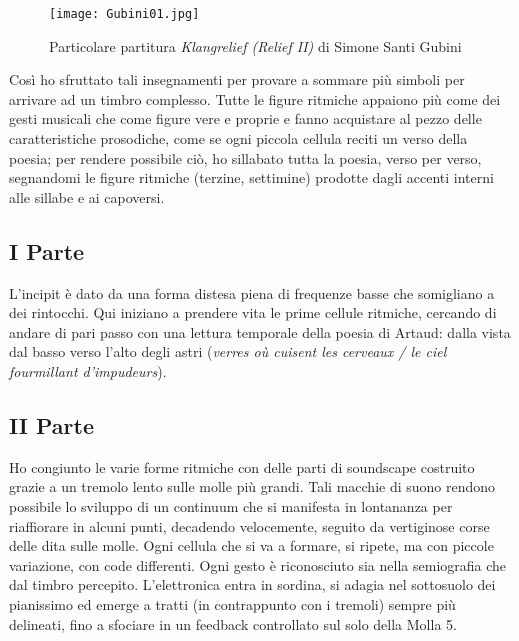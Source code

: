 \begin{figure}[htbp]
\begin{center}
\texttt{[image: Gubini01.jpg]}
\caption{Particolare partitura \textit{Klangrelief (Relief II)} di Simone Santi Gubini}
\label{default}
\end{center}
\end{figure}


Così ho sfruttato tali insegnamenti per provare a sommare più simboli per arrivare ad un timbro complesso.
Tutte le figure ritmiche appaiono più come dei gesti musicali che come figure vere e proprie e fanno acquistare al pezzo delle caratteristiche prosodiche, come se ogni piccola cellula reciti un verso della poesia; per rendere possibile ciò, ho sillabato tutta la poesia, verso per verso, segnandomi le figure ritmiche (terzine, settimine) prodotte dagli accenti interni alle sillabe e ai capoversi.


\subsection*{I Parte}

L'incipit è dato da una forma distesa piena di frequenze basse che somigliano a dei rintocchi. Qui iniziano a prendere vita le prime cellule ritmiche, cercando di andare di pari passo con una lettura temporale della poesia di Artaud: dalla vista dal basso verso l'alto degli astri (\textit{verres où cuisent les cerveaux / le ciel fourmillant d'impudeurs}).


\subsection*{II Parte}

Ho congiunto le varie forme ritmiche con delle parti di soundscape costruito grazie a un tremolo lento sulle molle più grandi. Tali macchie di suono rendono possibile lo sviluppo di un continuum che si manifesta in lontananza per riaffiorare in alcuni punti, decadendo velocemente, seguito da vertiginose corse delle dita sulle molle. Ogni cellula che si va a formare, si ripete, ma con piccole variazione, con code differenti. Ogni gesto è riconosciuto sia nella semiografia che dal timbro percepito. L'elettronica entra in sordina, si adagia nel sottosuolo dei pianissimo ed emerge a tratti (in contrappunto con i tremoli) sempre più delineati, fino a sfociare in un feedback controllato sul solo della Molla 5. 


